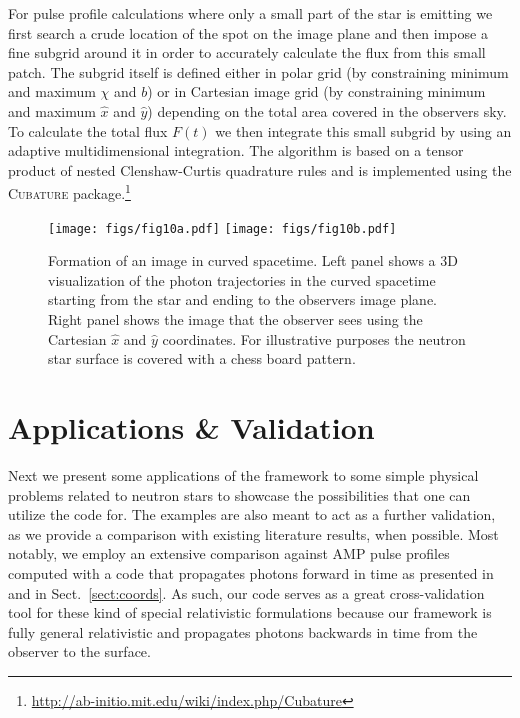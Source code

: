 \documentclass{aa}
\begin{document}
For pulse profile calculations where only a small part of the star is
emitting we first search a crude location of the spot on the image plane
and then impose a fine subgrid around it in order to accurately
calculate the flux from this small patch.  The subgrid itself is defined
either in polar grid (by constraining minimum and maximum $\chi$ and
$b$) or in Cartesian image grid (by constraining minimum and maximum
$\hat{x}$ and $\hat{y}$) depending on the total area covered in the observers sky.  To
calculate the total flux $F(t)$ we then integrate this small subgrid by
using an adaptive multidimensional integration.  The algorithm is based
on a tensor product of nested Clenshaw-Curtis quadrature rules and is
implemented using the \textsc{Cubature} package.\footnote{
\url{http://ab-initio.mit.edu/wiki/index.php/Cubature}}



\begin{figure}
\centering
\texttt{[image: figs/fig10a.pdf]}
\texttt{[image: figs/fig10b.pdf]}
\caption{\label{fig:image}
  Formation of an image in curved spacetime.
  Left panel shows a 3D visualization of the photon trajectories in the curved spacetime starting from the star and ending to the observers image plane.
  Right panel shows the image that the observer sees using the Cartesian $\hat{x}$ and $\hat{y}$ coordinates.
  For illustrative purposes the neutron star surface is covered with a chess board pattern.
  }
\end{figure}


\section{Applications \& Validation}\label{sect:appl}

Next we present some applications of the framework to some simple physical problems related to neutron stars to showcase the possibilities that one can utilize the code for.
The examples are also meant to act as a further validation, as we provide a comparison with existing literature results, when possible.
Most notably, we employ an extensive comparison against AMP pulse profiles computed with a code that propagates photons forward in time as presented in \citet{PB06} and in Sect.~\ref{sect:coords}.
As such, our code serves as a great cross-validation tool for these kind of special relativistic formulations because our framework is fully general relativistic and propagates photons backwards in time from the observer to the surface.
\end{document}
